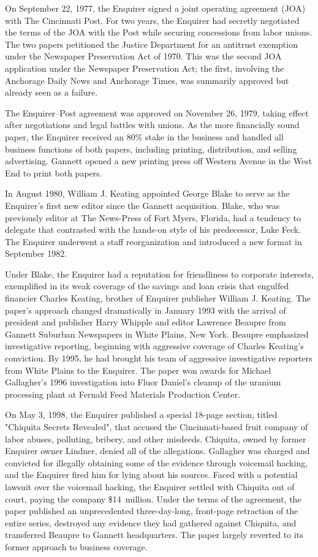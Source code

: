 On September 22, 1977, the Enquirer signed a joint operating agreement
(JOA) with The Cincinnati Post. For two years, the Enquirer had secretly
negotiated the terms of the JOA with the Post while securing concessions
from labor unions. The two papers petitioned the Justice Department for
an antitrust exemption under the Newspaper Preservation Act of 1970.
This was the second JOA application under the Newspaper Preservation
Act; the first, involving the Anchorage Daily News and Anchorage Times,
was summarily approved but already seen as a failure.

The Enquirer--Post agreement was approved on November 26, 1979, taking
effect after negotiations and legal battles with unions. As the more
financially sound paper, the Enquirer received an 80\% stake in the
business and handled all business functions of both papers, including
printing, distribution, and selling advertising. Gannett opened a new
printing press off Western Avenue in the West End to print both papers.

In August 1980, William J. Keating appointed George Blake to serve as
the Enquirer's first new editor since the Gannett acquisition. Blake,
who was previously editor at The News-Press of Fort Myers, Florida, had
a tendency to delegate that contrasted with the hands-on style of his
predecessor, Luke Feck. The Enquirer underwent a staff reorganization
and introduced a new format in September 1982.

Under Blake, the Enquirer had a reputation for friendliness to corporate
interests, exemplified in its weak coverage of the savings and loan
crisis that engulfed financier Charles Keating, brother of Enquirer
publisher William J. Keating. The paper's approach changed dramatically
in January 1993 with the arrival of president and publisher Harry
Whipple and editor Lawrence Beaupre from Gannett Suburban Newspapers in
White Plains, New York. Beaupre emphasized investigative reporting,
beginning with aggressive coverage of Charles Keating's conviction. By
1995, he had brought his team of aggressive investigative reporters from
White Plains to the Enquirer. The paper won awards for Michael
Gallagher's 1996 investigation into Fluor Daniel's cleanup of the
uranium processing plant at Fernald Feed Materials Production Center.

On May 3, 1998, the Enquirer published a special 18-page section, titled
"Chiquita Secrets Revealed", that accused the Cincinnati-based fruit
company of labor abuses, polluting, bribery, and other misdeeds.
Chiquita, owned by former Enquirer owner Lindner, denied all of the
allegations. Gallagher was charged and convicted for illegally obtaining
some of the evidence through voicemail hacking, and the Enquirer fired
him for lying about his sources. Faced with a potential lawsuit over the
voicemail hacking, the Enquirer settled with Chiquita out of court,
paying the company \$14~million. Under the terms of the agreement, the
paper published an unprecedented three-day-long, front-page retraction
of the entire series, destroyed any evidence they had gathered against
Chiquita, and transferred Beaupre to Gannett headquarters. The paper
largely reverted to its former approach to business coverage.


